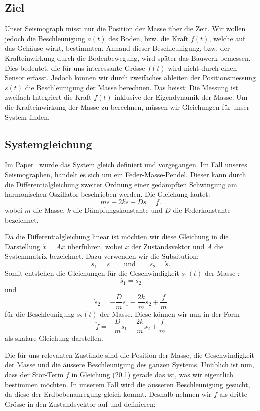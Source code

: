 \subsection{Ziel}
Unser Seismograph misst nur die Position der Masse über die Zeit. 
Wir wollen jedoch die Beschleunigung $a(t)$ des Boden, bzw. die Kraft $f(t)$, welche auf das Gehäuse wirkt, bestimmten.  
Anhand dieser Beschleunigung, bzw. der Krafteinwirkung durch die Bodenbewegung, wird später das Bauwerk bemessen.
Dies bedeutet, die für uns interessante Grösse $f(t)$ wird nicht durch einen Sensor erfasst. 
Jedoch können wir durch zweifaches ableiten der Positionsmessung $s(t)$ die Beschleunigung der Masse berechnen. 
Das heisst: Die Messung ist zweifach Integriert die Kraft $f(t)$ inklusive der Eigendynamik der Masse.
Um die Krafteinwirkung der Masse zu berechnen, müssen wir Gleichungen für unser System finden.

\subsection{Systemgleichung}
Im Paper~\cite{erdbeben:mendezmueller} wurde das System gleich definiert und vorgegangen. 
Im Fall unseres Seismographen, handelt es sich um ein Feder-Masse-Pendel.
Dieser kann durch die Differentialgleichung zweiter Ordnung einer gedämpften Schwingung am harmonischen Oszillator beschrieben werden. 
Die Gleichung lautet:
\begin{equation}
m\ddot s + 2k \dot s + Ds = f.
\end{equation}
wobei $m$ die Masse, $k$ die Dämpfungskonstante und $D$ die Federkonstante bezeichnet.


Da die Differentialgleichung linear ist möchten wir diese Gleichung in die Darstellung $\dot x = Ax$ überführen, wobei $x$ der Zustandsvektor und $A$ die Systemmatrix bezeichnet. Dazu verwenden wir die Subsitution:
\[ 
s_1 = s 
\qquad \text{und} \qquad
s_2 = \dot s.
\]
Somit entstehen die Gleichungen für die Geschwindigkeit $ \dot s_1(t)$ der Masse :
\[ \dot {s_1} = {s_2}\] 
und
\[ \dot s_2 = -\frac{D}{m} {s_1} -\frac{2k}{m} {s_2} + \frac{f} {m} \] 
für die Beschleunigung $\dot s_2(t)$ der Masse.
Diese können wir nun in der Form
\[ \ddot f =-\frac{D}{m} {s_1} -\frac{2k}{m} {s_2} + \frac{f} {m} \]
als skalare Gleichung darstellen.

Die für uns relevanten Zustände sind die Position der Masse, die Geschwindigkeit der Masse und die äussere Beschleunigung des ganzen Systems.
Unüblich ist nun, dass der Stör-Term $f$ in Gleichung (20.1) gerade das ist, was wir eigentlich bestimmen möchten.  
In unserem Fall wird die äusseren Beschleunigung gesucht, da diese der Erdbebenanregung gleich kommt.
Deshalb nehmen wir $f$ als dritte Grösse in den Zustandsvektor auf und definieren:

